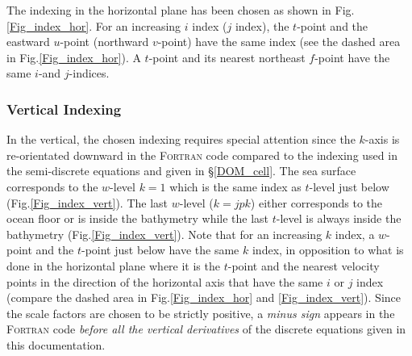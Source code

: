 The indexing in the horizontal plane has been chosen as shown in Fig.\ref{Fig_index_hor}. 
For an increasing $i$ index ($j$ index), the $t$-point and the eastward $u$-point 
(northward $v$-point) have the same index (see the dashed area in Fig.\ref{Fig_index_hor}). 
A $t$-point and its nearest northeast $f$-point have the same $i$-and $j$-indices.

\subsubsection{Vertical Indexing}
\label{DOM_Num_Index_vertical}

In the vertical, the chosen indexing requires special attention since the 
$k$-axis is re-orientated downward in the \textsc{Fortran} code compared 
to the indexing used in the semi-discrete equations and given in \S\ref{DOM_cell}. 
The sea surface corresponds to the $w$-level $k=1$ which is the same index 
as $t$-level just below (Fig.\ref{Fig_index_vert}). The last $w$-level ($k=jpk$) 
either corresponds to the ocean floor or is inside the bathymetry while the last 
$t$-level is always inside the bathymetry (Fig.\ref{Fig_index_vert}). Note that 
for an increasing $k$ index, a $w$-point and the $t$-point just below have the 
same $k$ index, in opposition to what is done in the horizontal plane where 
it is the $t$-point and the nearest velocity points in the direction of the horizontal 
axis that have the same $i$ or $j$ index (compare the dashed area in 
Fig.\ref{Fig_index_hor} and \ref{Fig_index_vert}). Since the scale factors are 
chosen to be strictly positive, a \emph{minus sign} appears in the \textsc{Fortran} 
code \emph{before all the vertical derivatives} of the discrete equations given in 
this documentation.

